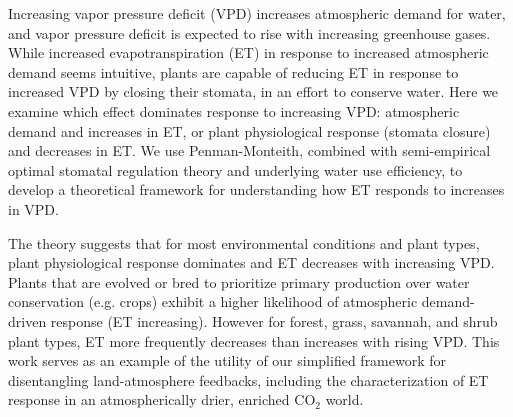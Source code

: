 Increasing vapor pressure deficit (VPD) increases atmospheric demand for
water, and vapor pressure deficit is expected to rise with increasing
greenhouse gases. While increased evapotranspiration (ET) in response to
increased atmospheric demand seems intuitive, plants are capable of
reducing ET in response to increased VPD by closing their stomata, in an
effort to conserve water. Here we examine which effect dominates
response to increasing VPD: atmospheric demand and increases in ET, or
plant physiological response (stomata closure) and decreases in ET. We
use Penman-Monteith, combined with semi-empirical optimal stomatal
regulation theory and underlying water use efficiency, to develop a
theoretical framework for understanding how ET responds to increases in
VPD.

The theory suggests that for most environmental conditions and plant
types, plant physiological response dominates and ET decreases with
increasing VPD. Plants that are evolved or bred to prioritize primary
production over water conservation (e.g. crops) exhibit a higher
likelihood of atmospheric demand-driven response (ET
increasing). However for forest, grass, savannah, and shrub plant types,
ET more frequently decreases than increases with rising VPD. This work
serves as an example of the utility of our simplified framework for
disentangling land-atmosphere feedbacks, including
the characterization of ET response in an atmospherically drier,
enriched CO$_2$ world.
